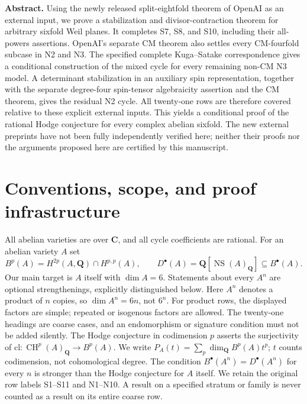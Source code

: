 \documentclass[11pt,reqno]{article}
\renewenvironment{abstract}
  {\small\noindent\textbf{Abstract.}\enspace\ignorespaces}
  {\par\vspace{10pt}}
\theoremstyle{emphasizedplain}
\theoremstyle{emphasizeddefinition}
\theoremstyle{emphasizeddefinition}
\DeclareMathOperator{\NS}{NS}
\DeclareMathOperator{\CH}{CH}
\newcommand{\Q}{\mathbf Q}
\newcommand{\C}{\mathbf C}
\newcommand{\B}{B}
\newcommand{\D}{D}
\begin{document}
\begin{abstract}
Using the newly released split-eightfold theorem of OpenAI as an external
input, we prove a stabilization and divisor-contraction theorem for
arbitrary sixfold Weil planes. It completes S7, S8, and S10, including
their all-powers assertions. OpenAI's separate CM theorem also settles
every CM-fourfold subcase in N2 and N3. The specified complete
Kuga--Satake correspondence gives a conditional construction of the
mixed cycle for every remaining non-CM N3 model. A determinant
stabilization in an auxiliary spin representation, together with the
separate degree-four spin-tensor algebraicity assertion and the CM
theorem, gives the residual N2 cycle. All twenty-one rows are therefore
covered relative to these explicit external inputs. This yields a
conditional proof of the rational Hodge conjecture for every complex
abelian sixfold. The new external preprints have not been fully
independently verified here; neither their proofs nor the arguments
proposed here are certified by this manuscript.
\end{abstract}
\clearpage
{\setlength{\parskip}{0pt}\tableofcontents}
\clearpage

\section*{Conventions, scope, and proof infrastructure}
All abelian varieties are over $\C$, and all cycle coefficients are rational.
For an abelian variety $A$ set
\[
 \B^p(A)=H^{2p}(A,\Q)\cap H^{p,p}(A),\qquad
 \D^\bullet(A)=\Q[\NS(A)_\Q]\subseteq\B^\bullet(A).
\]
Our main target is $A$ itself with $\dim A=6$. Statements about every
$A^n$ are optional strengthenings, explicitly distinguished below.
Here $A^n$ denotes a product of $n$ copies, so $\dim A^n=6n$, not $6^n$.
For product rows, the displayed factors are simple; repeated or isogenous
factors are allowed. The twenty-one headings are coarse cases, and an
endomorphism or signature condition must not be added silently.
The Hodge conjecture in codimension $p$ asserts the surjectivity of
$\mathrm{cl}:\CH^p(A)_\Q\longrightarrow\B^p(A)$.
We write $P_A(t)=\sum_p\dim_\Q\B^p(A)t^p$; $t$ counts codimension,
not cohomological degree. The condition $\B^\bullet(A^n)=\D^\bullet(A^n)$
for every $n$ is stronger than the Hodge conjecture for $A$ itself.
We retain the original row labels S1--S11 and N1--N10. A result on a specified
stratum or family is never counted as a result on its entire coarse row.
\end{document}

